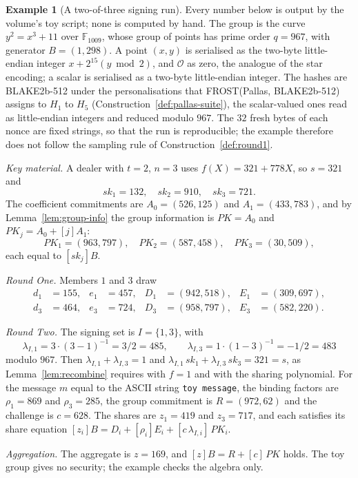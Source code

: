 \documentclass[11pt,a4paper]{article}
\theoremstyle{definition}
\newtheorem{example}[theorem]{Example}
\newcommand{\F}{\mathbb{F}}
\begin{document}
\begin{example}[A two-of-three signing run]\label{ex:frost-toy}
Every number below is output by the volume's toy script; none is computed
by hand. The group is the curve \(y^2 = x^3 + 11\) over \(\F_{1009}\),
whose group of points has prime order \(q = 967\), with generator
\(B = (1, 298)\). A point \((x, y)\) is serialised as the two-byte
little-endian integer \(x + 2^{15}(y \bmod 2)\), and \(\mathcal{O}\) as zero,
the analogue of the star encoding; a scalar is serialised as a two-byte
little-endian integer. The hashes are BLAKE2b-512 under the personalisations
that FROST(Pallas, BLAKE2b-512) assigns to \(H_1\) to \(H_5\)
(Construction~\ref{def:pallas-suite}), the scalar-valued ones read as
little-endian integers and reduced modulo \(967\). The \(32\) fresh bytes of
each nonce are fixed strings, so that the run is reproducible; the example
therefore does not follow the sampling rule of
Construction~\ref{def:round1}.

\emph{Key material.} A dealer with \(t = 2\), \(n = 3\) uses
\(f(X) = 321 + 778 X\), so \(s = 321\) and
\[
  \mathit{sk}_1 = 132 , \quad \mathit{sk}_2 = 910 , \quad
  \mathit{sk}_3 = 721 .
\]
The coefficient commitments are \(A_0 = (526, 125)\) and
\(A_1 = (433, 783)\), and by Lemma~\ref{lem:group-info} the group
information is \(\mathit{PK} = A_0\) and
\(\mathit{PK}_j = A_0 + [j]A_1\):
\[
  \mathit{PK}_1 = (963, 797) , \quad \mathit{PK}_2 = (587, 458) , \quad
  \mathit{PK}_3 = (30, 509) ,
\]
each equal to \([\mathit{sk}_j]B\).

\emph{Round One.} Members \(1\) and \(3\) draw
\begin{align*}
  d_1 &= 155 , & e_1 &= 457 , & D_1 &= (942, 518) , & E_1 &= (309, 697) ,
  \\
  d_3 &= 464 , & e_3 &= 724 , & D_3 &= (958, 797) , & E_3 &= (582, 220) .
\end{align*}

\emph{Round Two.} The signing set is \(I = \{1, 3\}\), with
\[
  \lambda_{I,1} = 3 \cdot (3 - 1)^{-1} = 3/2 = 485 , \qquad
  \lambda_{I,3} = 1 \cdot (1 - 3)^{-1} = -1/2 = 483
\]
modulo \(967\). Then \(\lambda_{I,1} + \lambda_{I,3} = 1\) and
\(\lambda_{I,1}\, \mathit{sk}_1 + \lambda_{I,3}\, \mathit{sk}_3 = 321 = s\),
as Lemma~\ref{lem:recombine} requires with \(f = 1\) and with the sharing
polynomial. For the message \(m\) equal to the ASCII string
\texttt{toy message}, the binding factors are \(\rho_1 = 869\) and
\(\rho_3 = 285\), the group commitment is \(R = (972, 62)\) and the
challenge is \(c = 628\). The shares are \(z_1 = 419\) and \(z_3 = 717\),
and each satisfies its share equation
\([z_i]B = D_i + [\rho_i]E_i + [c\, \lambda_{I,i}]\,\mathit{PK}_i\).

\emph{Aggregation.} The aggregate is \(z = 169\), and
\([z]B = R + [c]\,\mathit{PK}\) holds. The toy group gives no security;
the example checks the algebra only.
\end{example}
\end{document}
